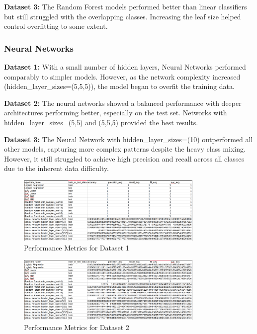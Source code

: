 \textbf{Dataset 3:} The Random Forest models performed better than linear classifiers but still struggled with the overlapping classes. Increasing the leaf size helped control overfitting to some extent.

\subsubsection*{Neural Networks}
\textbf{Dataset 1:} With a small number of hidden layers, Neural Networks performed comparably to simpler models. However, as the network complexity increased (hidden\_layer\_sizes=(5,5,5)), the model began to overfit the training data.

\textbf{Dataset 2:} The neural networks showed a balanced performance with deeper architectures performing better, especially on the test set. Networks with hidden\_layer\_sizes=(5,5) and (5,5,5) provided the best results.

\textbf{Dataset 3:} The Neural Network with hidden\_layer\_sizes=(10) outperformed all other models, capturing more complex patterns despite the heavy class mixing. However, it still struggled to achieve high precision and recall across all classes due to the inherent data difficulty.

\begin{figure}[H]
    \centering
    \includegraphics[width=0.8\textwidth]{Images/dataset-1-step6.png}
    \caption{Performance Metrics for Dataset 1}
\end{figure}

\begin{figure}[H]
    \centering
    \includegraphics[width=0.8\textwidth]{Images/dataset-2-step6.png}
    \caption{Performance Metrics for Dataset 2}
\end{figure}

